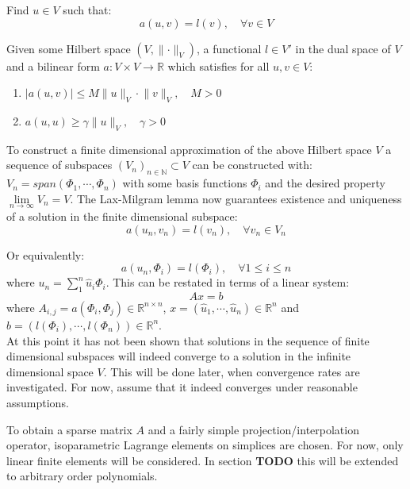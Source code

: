 \documentclass[11pt,a4paper]{article}
\begin{document}
Find $u \in V$ such that:
\begin{equation}
  a(u,v) = l(v), \quad \forall v \in V
\end{equation}

Given some Hilbert space $\left(V, \lVert \cdot \rVert_V\right)$, a functional
$l\in V'$ in the dual space of $V$ and a bilinear form $a: V \times V
\rightarrow \mathbb{R}$ which satisfies for all $u,v\in V$:
\begin{enumerate}
  \item $|a(u,v)| \leq M \lVert u \rVert_V \cdot \lVert v \rVert_V, \quad M > 0$
  \item $a(u,u) \geq \gamma \lVert u \rVert_V, \quad \gamma > 0$
\end{enumerate}


To construct a finite dimensional approximation of the above Hilbert space $V$
a sequence of subspaces $(V_n)_{n\in\mathbb{N}} \subset V$ can be constructed with:
$V_n = span(\Phi_1,\dotsb, \Phi_n)$ with some basis functions $\Phi_i$ and the
desired property $\lim\limits_{n\to \infty} V_n = V$.
The Lax-Milgram lemma now guarantees existence and uniqueness of a solution in
the finite dimensional subspace:
\begin{equation}
  a(u_n, v_n) = l(v_n), \quad \forall v_n \in V_n
\end{equation}

Or equivalently:
\begin{equation}
  a(u_n, \Phi_i) = l(\Phi_i), \quad \forall 1 \le i \le n
\end{equation}
where $u_n = \sum^n_1 \hat{u}_i\Phi_i$. This can be restated in terms of a
linear system:
$$Ax=b$$
where $A_{i,j} = a(\Phi_i, \Phi_j) \in \mathbb{R}^{n\times n}$,
$x = \left(\hat{u}_1, \dotsb, \hat{u}_n\right) \in \mathbb{R}^n$ and
$b = (l(\Phi_i), \dotsb, l(\Phi_n)) \in \mathbb{R}^n$.\\
At this point it has not been shown that solutions in the sequence of finite
dimensional subspaces will indeed converge to a solution in the infinite
dimensional space $V$. This will be done later, when convergence rates are
investigated. For now, assume that it indeed converges under reasonable
assumptions.

To obtain a sparse matrix $A$ and a fairly simple projection/interpolation
operator, isoparametric Lagrange elements on simplices are chosen. For now,
only linear finite elements will be considered. In section {\bf TODO} this will
be extended to arbitrary order polynomials.
\end{document}
